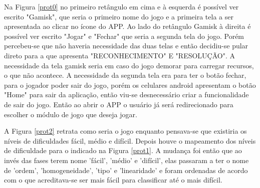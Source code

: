 Na Figura \ref{prot0} no primeiro retângulo em cima e à esquerda é possível ver escrito "Gamisk", que seria o primeiro nome do jogo e a primeira tela a ser apresentada ao clicar no ícone do APP. Ao lado do retângulo Gamisk à direita é possível ver escrito "Jogar" e "Fechar" que seria a segunda tela do jogo. Porém percebeu-se que não haveria necessidade das duas telas e então decidiu-se pular direto para a que apresenta "RECONHECIMENTO" E "RESOLUÇÃO". A necessidade da tela gamisk seria em caso do jogo demorar para carregar recursos, o que não acontece. A necessidade da segunda tela era para ter o botão fechar, para o jogador poder sair do jogo, porém os celulares android apresentam o botão "Home" para sair da aplicação, então viu-se desnecessário criar a funcionalidade de sair do jogo. Então ao abrir o APP o usuário já será redirecionado para escolher o módulo de jogo que deseja jogar.


A Figura \ref{prot2} retrata como seria o jogo enquanto pensava-se que existiria os níveis de dificuldades fácil, médio e difícil. Depois houve o mapeamento dos níveis de dificuldade para o indicado na Figura \ref{prot1}. A mudança foi então que ao invés das fases terem nome 'fácil', 'médio' e 'difícil', elas passaram a ter o nome de 'ordem', 'homogeneidade', 'tipo' e 'linearidade' e foram ordenadas de acordo com o que acreditava-se ser mais fácil para classificar até o mais difícil.


